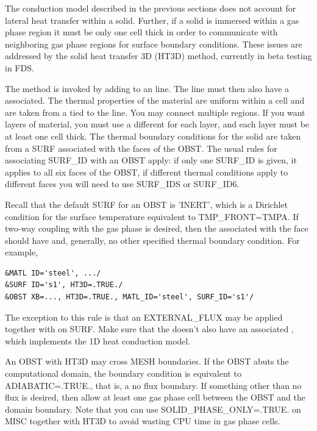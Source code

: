 \documentclass[11pt]{book}
\begin{document}
The conduction model described in the previous sections does not account for lateral heat transfer within a solid.  Further, if a solid is immersed within a gas phase region it must be only one cell thick in order to communicate with neighboring gas phase regions for surface boundary conditions.  These issues are addressed by the solid heat transfer 3D ({\ct HT3D}) method, currently in beta testing in FDS.

The method is invoked by adding {} to an {} line.  The {} line must then also have a {} associated.  The thermal properties of the material are uniform within a cell and are taken from a {} tied to the {} line.  You may connect multiple {} regions.  If you want layers of material, you must use a different {} for each layer, and each layer must be at least one cell thick. The thermal boundary conditions for the solid are taken from a {\ct SURF} associated with the faces of the {\ct OBST}.  The usual rules for associating {\ct SURF\_ID} with an {\ct OBST} apply: if only one {\ct SURF\_ID} is given, it applies to all six faces of the {\ct OBST}, if different thermal conditions apply to different faces you will need to use {\ct SURF\_IDS} or {\ct SURF\_ID6}.

Recall that the default {\ct SURF} for an {\ct OBST} is {\ct 'INERT'}, which is a Dirichlet condition for the surface temperature equivalent to {\ct TMP\_FRONT=TMPA}.  If two-way coupling with the gas phase is desired, then the {} associated with the {} face should have {} and, generally, no other specified thermal boundary condition.  For example,
\begin{lstlisting}
&MATL ID='steel', .../
&SURF ID='s1', HT3D=.TRUE./
&OBST XB=..., HT3D=.TRUE., MATL_ID='steel', SURF_ID='s1'/
\end{lstlisting}
The exception to this rule is that an {\ct EXTERNAL\_FLUX} may be applied together with {} on {\ct SURF}.  Make sure that the {} doesn't also have an associated {}, which implements the 1D heat conduction model.

An {\ct OBST} with {\ct HT3D} may cross {\ct MESH} boundaries.  If the {\ct OBST} abuts the computational domain, the boundary condition is equivalent to {\ct ADIABATIC=.TRUE.}, that is, a no flux boundary.  If something other than no flux is desired, then allow at least one gas phase cell between the {\ct OBST} and the domain boundary.  Note that you can use {\ct SOLID\_PHASE\_ONLY=.TRUE.} on {\ct MISC} together with {\ct HT3D} to avoid wasting CPU time in gas phase cells.
\end{document}
